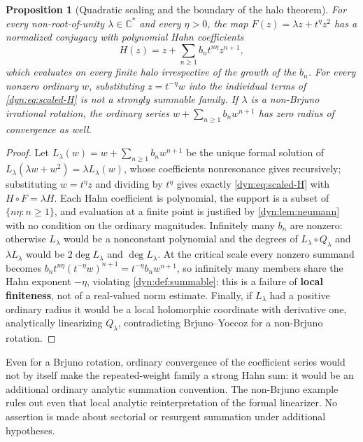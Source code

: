 \documentclass[11pt,letterpaper]{article}
\newtheorem{proposition}[proposition]{Proposition}
\theoremstyle{definition}
\theoremstyle{remark}
\newcommand{\C}{\mathbb C}
\numberwithin{equation}{section}
\begin{document}
\begin{proposition}[Quadratic scaling and the boundary of the halo theorem]
\label{dyn:prop:quadratic-scale}
For every non-root-of-unity $\lambda\in\C^{*}$ and every $\eta>0$, the map
$F(z)=\lambda z+t^{\eta}z^{2}$ has a normalized conjugacy with
\emph{polynomial} Hahn coefficients
\begin{equation}\label{dyn:eq:scaled-H}
 H(z)=z+\sum_{n\ge1}b_nt^{n\eta}z^{n+1},
\end{equation}
which evaluates on every finite halo irrespective of the growth of the
$b_n$. For every nonzero ordinary $w$, substituting $z=t^{-\eta}w$ into the
individual terms of \eqref{dyn:eq:scaled-H} is \emph{not} a strongly
summable family. If $\lambda$ is a non-Brjuno irrational rotation, the
ordinary series $w+\sum_{n\ge1}b_nw^{n+1}$ has zero radius of convergence
as well.
\end{proposition}
\begin{proof}
Let $L_\lambda(w)=w+\sum_{n\ge1}b_nw^{n+1}$ be the unique formal solution
of $L_\lambda(\lambda w+w^{2})=\lambda L_\lambda(w)$, whose coefficients
nonresonance gives recursively; substituting $w=t^{\eta}z$ and dividing by
$t^{\eta}$ gives exactly \eqref{dyn:eq:scaled-H} with
$H\circ F=\lambda H$. Each Hahn coefficient is polynomial, the support is a
subset of $\{n\eta:n\ge1\}$, and evaluation at a finite point is justified
by \cref{dyn:lem:neumann} with no condition on the ordinary magnitudes.
Infinitely many $b_n$ are nonzero: otherwise $L_\lambda$ would be a
nonconstant polynomial and the degrees of $L_\lambda\circ Q_\lambda$ and
$\lambda L_\lambda$ would be $2\deg L_\lambda$ and $\deg L_\lambda$. At the
critical scale every nonzero summand becomes
$b_nt^{n\eta}(t^{-\eta}w)^{n+1}=t^{-\eta}b_nw^{n+1}$, so infinitely many
members share the Hahn exponent $-\eta$, violating
\cref{dyn:def:summable}: this is a failure of \textbf{local finiteness},
not of a real-valued norm estimate. Finally, if $L_\lambda$ had a positive
ordinary radius it would be a local holomorphic coordinate with derivative
one, analytically linearizing $Q_\lambda$, contradicting Brjuno--Yoccoz for
a non-Brjuno rotation.
\end{proof}

Even for a Brjuno rotation, ordinary convergence of the coefficient series
would not by itself make the repeated-weight family a strong Hahn sum: it
would be an additional ordinary analytic summation convention. The
non-Brjuno example rules out even that local analytic reinterpretation of
the formal linearizer. No assertion is made about sectorial or resurgent
summation under additional hypotheses.
\end{document}
